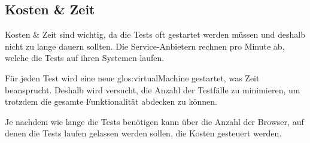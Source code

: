 \subsection{Kosten \& Zeit}
Kosten \& Zeit sind wichtig, da die Tests oft gestartet werden müssen und deshalb nicht zu lange dauern sollten. Die Service-Anbietern rechnen pro Minute ab, welche die Tests auf ihren Systemen laufen. 

Für jeden Test wird eine neue \Gls{glos:virtualMachine} gestartet, was Zeit beansprucht. Deshalb wird versucht, die Anzahl der Testfälle zu minimieren, um trotzdem die gesamte Funktionalität abdecken zu können.

Je nachdem wie lange die Tests benötigen kann über die Anzahl der Browser, auf denen die Tests laufen gelassen werden sollen, die Kosten gesteuert werden.
